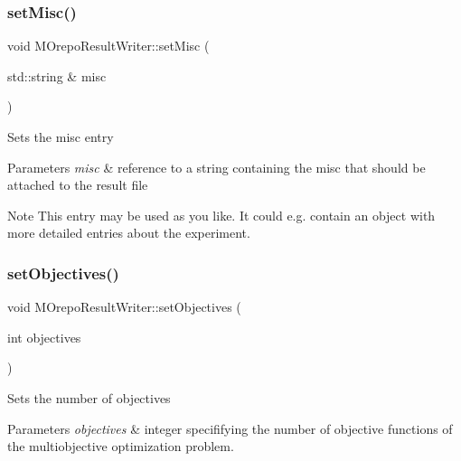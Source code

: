 \subsubsection{\texorpdfstring{set\+Misc()}{setMisc()}}
{\footnotesize\ttfamily void M\+Orepo\+Result\+Writer\+::set\+Misc (\begin{DoxyParamCaption}\item[{std\+::string \&}]{misc }\end{DoxyParamCaption})\hspace{0.3cm}{\ttfamily [inline]}}

Sets the misc entry 
\begin{DoxyParams}{Parameters}
{\em misc} & reference to a string containing the misc that should be attached to the result file \\
\hline
\end{DoxyParams}
\begin{DoxyNote}{Note}
This entry may be used as you like. It could e.\+g. contain an object with more detailed entries about the experiment. 
\end{DoxyNote}
\mbox{\label{class_m_orepo_result_writer_a1135d9cfb96df6420f178e02b11323ff}} 
\subsubsection{\texorpdfstring{set\+Objectives()}{setObjectives()}}
{\footnotesize\ttfamily void M\+Orepo\+Result\+Writer\+::set\+Objectives (\begin{DoxyParamCaption}\item[{int}]{objectives }\end{DoxyParamCaption})\hspace{0.3cm}{\ttfamily [inline]}}

Sets the number of objectives 
\begin{DoxyParams}{Parameters}
{\em objectives} & integer specififying the number of objective functions of the multiobjective optimization problem. \\
\hline
\end{DoxyParams}
\mbox{\label{class_m_orepo_result_writer_a31f71009c36802c9543790e3b57dfad6}} 
